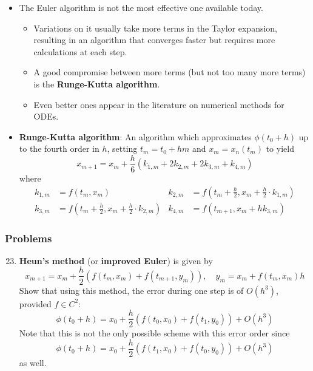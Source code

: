 \documentclass[../notes.tex]{subfiles}
\begin{document}
\begin{itemize}
    \item The Euler algorithm is not the most effective one available today.
    \begin{itemize}
        \item Variations on it usually take more terms in the Taylor expansion, resulting in an algorithm that converges faster but requires more calculations at each step.
        \item A good compromise between more terms (but not too many more terms) is the \textbf{Runge-Kutta algorithm}.
        \item Even better ones appear in the literature on numerical methods for ODEs.
    \end{itemize}
    \item \textbf{Runge-Kutta algorithm}: An algorithm which approximates $\phi(t_0+h)$ up to the fourth order in $h$, setting $t_m=t_0+hm$ and $x_m=x_n(t_m)$ to yield
    \begin{equation*}
        x_{m+1} = x_m+\frac{h}{6}(k_{1,m}+2k_{2,m}+2k_{3,m}+k_{4,m})
    \end{equation*}
    where
    \begin{align*}
        k_{1,m} &= f(t_m,x_m)&
            k_{2,m} &= f(t_m+\tfrac{h}{2},x_m+\tfrac{h}{2}\cdot k_{1,m})\\
        k_{3,m} &= f(t_m+\tfrac{h}{2},x_m+\tfrac{h}{2}\cdot k_{2,m})&
            k_{4,m} &= f(t_{m+1},x_m+hk_{3,m})
    \end{align*}
\end{itemize}

\subsubsection*{Problems}
\begin{enumerate}[label={\textbf{2.\arabic*.}},ref={2.\arabic*},leftmargin=3.5em]
    \setcounter{enumi}{22}
    \item \label{prb:2.23}\textbf{Heun's method} (or \textbf{improved Euler}) is given by
    \begin{equation*}
        x_{m+1} = x_m+\frac{h}{2}(f(t_m,x_m)+f(t_{m+1},y_m))
        ,\quad
        y_m = x_m+f(t_m,x_m)h
    \end{equation*}
    Show that using this method, the error during one step is of $O(h^3)$, provided $f\in C^2$:
    \begin{equation*}
        \phi(t_0+h) = x_0+\frac{h}{2}(f(t_0,x_0)+f(t_1,y_0))+O(h^3)
    \end{equation*}
    Note that this is not the only possible scheme with this error order since
    \begin{equation*}
        \phi(t_0+h) = x_0+\frac{h}{2}(f(t_1,x_0)+f(t_0,y_0))+O(h^3)
    \end{equation*}
    as well.
\end{enumerate}
\end{document}
